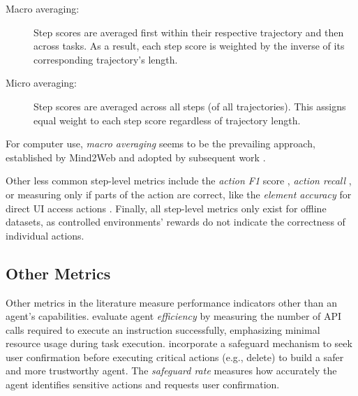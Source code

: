 \begin{description}
    \item[Macro averaging:] 
        Step scores are averaged first within their respective trajectory and then across tasks. As a result, each step score is weighted by the inverse of its corresponding trajectory's length.
    \item[Micro averaging:] 
        Step scores are averaged across all steps (of all trajectories). This assigns equal weight to each step score regardless of trajectory length.
\end{description}

For computer use, \emph{macro averaging} seems to be the prevailing approach, established by Mind2Web \citep{deng_mind2web_2023} and adopted by subsequent work .

Other less common step-level metrics include the \emph{action F1} score , \emph{action recall} , or measuring only if parts of the action are correct, like the \emph{element accuracy} for direct UI access actions .
Finally, all step-level metrics only exist for offline datasets, as controlled environments' rewards do not indicate the correctness of individual actions.


\subsection{Other Metrics}

Other metrics in the literature measure performance indicators other than an agent's capabilities.
\citet{song_restgpt_2023} evaluate agent \emph{efficiency} by measuring the number of API calls required to execute an instruction successfully, emphasizing minimal resource usage during task execution.
\citet{zhang_ufo_2024} incorporate a safeguard mechanism to seek user confirmation before executing critical actions (e.g., delete) to build a safer and more trustworthy agent. The \emph{safeguard rate} measures how accurately the agent identifies sensitive actions and requests user confirmation. 

